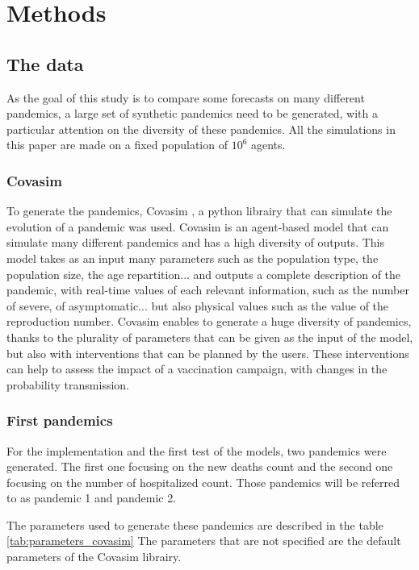 \section{Methods}

\subsection*{The data}

As the goal of this study is to compare some forecasts on many different pandemics, a large set of synthetic pandemics need to be generated, with a particular attention on the diversity of these pandemics. 
All the simulations in this paper are made on a fixed population of $10^6$ agents. 
\subsubsection{Covasim}

To generate the pandemics,  Covasim \cite{kerr2021covasim}, a python librairy that can simulate the evolution of a pandemic was used. 
Covasim is an agent-based model that can simulate many different pandemics and has a high diversity of outputs. 
This model takes as an input many parameters such as the population type, the population size, the age repartition... and outputs a complete description of the pandemic, with real-time values of each relevant information, such as the number of severe, of asymptomatic... but also physical values such as the value of the reproduction number. 
Covasim enables to generate a huge diversity of pandemics, thanks to the plurality of parameters that can be given as the input of the model, but also with interventions that can be planned by the users. 
These interventions can help to assess the impact of a vaccination campaign, with changes in the probability transmission. 

\subsubsection{First pandemics}

For the implementation and the first test of the models, two pandemics were generated. 
The first one focusing on the new deaths count and the second one focusing on the number of hospitalized count. 
Those pandemics will be referred to as pandemic 1 and pandemic 2. 




The parameters used to generate these pandemics are described in the table \ref{tab:parameters_covasim} 
The parameters that are not specified are the default parameters of the Covasim librairy. 


